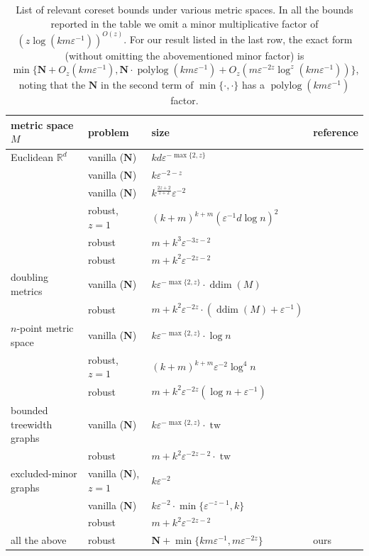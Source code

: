 \documentclass[letterpaper,11pt]{article}
\theoremstyle{plain}
\theoremstyle{definition}
\theoremstyle{remark}
\DeclareMathOperator{\polylog}{polylog}
\DeclareMathOperator{\ddim}{ddim}
\DeclareMathOperator{\tw}{tw}
\newcommand{\eps}{\varepsilon}
\renewcommand{\epsilon}{\varepsilon}
\begin{document}
\begin{table}[ht]
    \centering
    \caption{\small List of relevant coreset bounds under various metric spaces.
    In all the bounds reported in the table we omit a minor multiplicative factor of $(z\log(km\eps^{-1}))^{O(z)}$.
    For our result listed in the last row, the exact form (without omitting the abovementioned minor factor) is
    $\min\{ \mathbf{N} + O_z(km\epsilon^{-1}), \mathbf{N} \cdot \polylog(km\epsilon^{-1}) + O_z(m\epsilon^{-2z}\log^z(km\eps^{-1}))  \}$,
    noting that the $\mathbf{N}$ in the second term of $\min\{\cdot,\cdot\}$ has a $\polylog(km\epsilon^{-1})$ factor.
    }
    \label{tab:result}
    \small
    \begin{tabularx}{\textwidth}{llll}
        \toprule
        metric space $M$ & problem & size & reference \\
        \midrule
        Euclidean $\mathbb{R}^d$ & vanilla ($\mathbf{N}$) &  $
        kd\eps^{-\max\{2,z\}}$ & \cite{Cohen-addad2021New} \\
        &vanilla ($\mathbf{N}$)& $k\eps^{-2-z}$ & \cite{Cohen-Addad22Towards}\\
        &vanilla ($\mathbf{N}$)& $k^{\frac{2z+2}{z+2}}\eps^{-2}$ & \cite{Huang22OnOptimal}\\
& robust, $z = 1$ & $(k+m)^{k+m}(\eps^{-1}d\log n)^2$ & \cite{feldman2012data} \\
         & robust & $m + k^3\eps^{-3z-2}$ & \cite{Huang2022Near-optimal} \\
         & robust        & $m+k^2\eps^{-2z-2}$ & \cite{Huang2023General}  \\
doubling metrics 
        & vanilla ($\mathbf{N}$) & $k\epsilon^{-\max\{2, z\}} \cdot \ddim(M)$ & \cite{Cohen-addad2021New} \\
& robust        & $m + k^2\eps^{-2z}\cdot(\ddim(M)+\eps^{-1})$ & \cite{Huang2023General}      \\
$n$-point metric space & vanilla ($\mathbf{N}$) & $k\eps^{-\max\{2,z\}}\cdot\log n$ & \cite{Cohen-addad2021New} \\
& robust, $z = 1$        & $(k+m)^{k+m}\eps^{-2}\log^4 n$ & \cite{feldman2012data} \\
         & robust        & $m + k^2\eps^{-2z}(\log n+\eps^{-1})$ & \cite{Huang2023General} \\
bounded treewidth graphs & vanilla ($\mathbf{N}$) & $k\eps^{-\max\{2,z\}}\cdot\tw$ & \cite{Cohen-addad2021New} \\
& robust        & $m + k^2\eps^{-2z-2}\cdot \tw$ & \cite{Huang2023General} \\
excluded-minor graphs & vanilla ($\mathbf{N}$), $z = 1$ & $k\eps^{-2}$ & \cite{Cohen-AddadD0SS25} \\
         & vanilla ($\mathbf{N}$) & $k\eps^{-2}\cdot \min\{\eps^{-z-1}, k\}$ & \cite{Cohen-AddadD0SS25} \\
         & robust        & $m + k^2\eps^{-2z-2}$ & \cite{Huang2023General}      \\
all the above & robust & $\mathbf{N} + \min\{km\epsilon^{-1}, m\epsilon^{-2z}\}$ & ours \\
        \bottomrule
    \end{tabularx}
\end{table}
\end{document}
